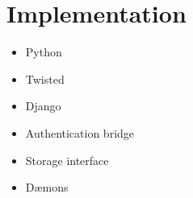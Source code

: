 \chapter{Implementation}

\begin{itemize}
    \item Python
    \item Twisted
    \item Django
    \item Authentication bridge
    \item Storage interface
    \item D{\ae}mons
\end{itemize}
